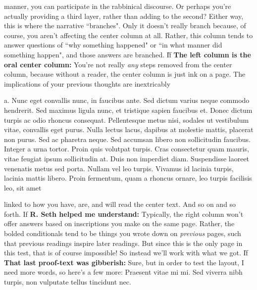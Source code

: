 \documentclass[11pt,letterpaper,openany]{scrbook}
\newcommand{\rightcitation}[1]{\rightcitationfont{\normalsize\textcolor{hcolor}{#1}}}
\begin{document}
\begin{sloppypar}
\begin{paracol}{3}
\switchcolumn

\fontsize{11}{13}\rightfont manner, you can participate in the rabbinical discourse. Or perhaps you're actually providing a third layer, rather than adding to the second? Either way, this is where the narrative ``branches". Only it doesn't really branch because, of course,  you aren't affecting the center column at all. Rather, this column tends to answer questions of ``why something happened" or ``in what manner did something happen", and those answers are branched. \big\| If \textbf{The left column is the oral center column:} You're not really \textit{any} steps  removed from the center column, because without a reader, the center column is just ink on a page. The implications of your previous thoughts are inextricably

\end{paracol}

\begin{paracol}{2}\fontsize{11}{13}\leftfont a. Nunc eget convallis nunc, in faucibus ante. Sed dictum varius neque commodo hendrerit. Sed maximus ligula nunc, et tristique sapien faucibus et. Donec dictum turpis ac odio rhoncus consequat. Pellentesque metus nisi, sodales ut vestibulum vitae, convallis eget purus. Nulla lectus lacus, dapibus at molestie mattis, placerat non purus. Sed ac pharetra neque. Sed accumsan libero non sollicitudin faucibus. Integer a urna tortor. Proin quis volutpat turpis. Cras consectetur quam mauris, vitae feugiat ipsum sollicitudin at. Duis non imperdiet diam. Suspendisse laoreet venenatis metus sed porta. Nullam vel leo turpis. Vivamus id lacinia turpis, lacinia mattis libero. Proin fermentum, quam a rhoncus ornare, leo turpis facilisis leo, sit amet

\switchcolumn

\fontsize{11}{13}\rightfont linked to how you have, are, and will read the center text. And so on and so forth.  \rightcitation{ב} \rightfont If \textbf{R. Seth helped me understand:} Typically, the right column won't offer answers based on inscriptions you make on the same page. Rather, the bolded conditionals tend to be things you wrote down on \textit{previous} pages, such that previous readings inspire later readings. But since this is the only page in this test, that is of course impossible! So instead we'll work with what we got. \big\| If \textbf{That last proof-text was gibberish:} Sure, but in order to test the layout, I need more words, so here's a few more: Praesent vitae mi mi. Sed viverra nibh turpis, non vulputate tellus tincidunt nec.


\end{paracol}
\end{sloppypar}
\end{document}
